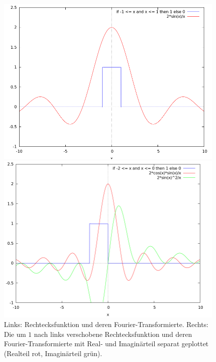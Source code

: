\begin{remark}
\begin{description}
  \begin{figure}[ht]
      \centering
      \begin{minipage}{0.49\linewidth}
        \centering
        \includegraphics[width=\linewidth]{Bilder/Rechteck1}
      \end{minipage}
      \begin{minipage}{0.49\linewidth}
        \centering
        \includegraphics[width=\linewidth]{Bilder/Rechteck2}
      \end{minipage}
      \caption{Links: Rechtecksfunktion und deren Fourier-Transformierte. Rechts: Die um $ 1 $
        nach links verschobene Rechtecksfunktion und deren Fourier-Transformierte mit Real- und 
        Imaginärteil separat geplottet (Realteil rot, Imaginärteil grün).}

\end{figure}
\end{description}
\end{remark}
